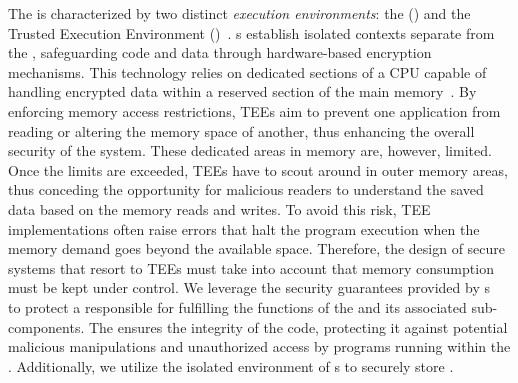 The  is characterized by two distinct \textit{execution environments}: the  () and the Trusted Execution Environment ()~\citep{DBLP:conf/trustcom/SabtAB15}. s establish isolated contexts separate from the , safeguarding code and data through hardware-based encryption mechanisms. This technology relies on %
dedicated sections of a CPU capable of handling encrypted data within a reserved section of the main memory~\citep{costan2016intel}.
By enforcing memory access restrictions, TEEs aim to prevent one application from reading or altering the memory space of another, thus enhancing the overall security of the system.
These dedicated areas in memory are, however, limited.
Once the limits are exceeded, TEEs have to scout around in outer memory areas, thus conceding the opportunity for malicious readers to understand the saved data based on the memory reads and writes.
To avoid this risk, TEE implementations often raise errors that halt the program execution when the memory demand goes beyond the available space. %
Therefore, the design of secure systems that resort to TEEs must take into account that memory consumption must be kept under control. 
We leverage the security guarantees provided by s~\citep{DBLP:journals/ieeesp/JauernigSS20} to protect a  responsible for fulfilling the functions of the  and its associated sub-components. %
The  ensures the integrity of the  code, protecting it against potential malicious manipulations and unauthorized access by programs running within the . Additionally, we utilize the isolated environment of s to securely store .
